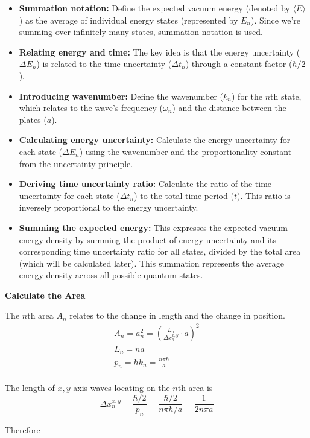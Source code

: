 \begin{itemize}
    \item \textbf{Summation notation:} Define the expected vacuum energy (denoted by $\langle E \rangle$ ) 
    as the average of individual energy states (represented by $E_n$). 
    Since we're summing over infinitely many states, summation notation is used.
    \item \textbf{Relating energy and time:} The key idea is that the energy uncertainty ($\Delta E_n$) is related 
    to the time uncertainty ($\Delta t_n$) through a constant factor ($\hbar/2$).
    \item \textbf{Introducing wavenumber:} Define the wavenumber ($k_n$) for the $n$th state, 
    which relates to the wave's frequency ($\omega_n$) and the distance between the plates ($a$).
    \item \textbf{Calculating energy uncertainty:} Calculate the energy uncertainty for each state ($\Delta E_n$)
     using the wavenumber and the proportionality constant from the uncertainty principle.
    \item \textbf{Deriving time uncertainty ratio:} Calculate the ratio of the time uncertainty for each state ($\Delta t_n$)
     to the total time period ($t$). This ratio is inversely proportional to the energy uncertainty.
    \item \textbf{Summing the expected energy:} This expresses the expected vacuum energy density by summing 
    the product of energy uncertainty and its corresponding time uncertainty ratio for all states, 
    divided by the total area (which will be calculated later). 
    This summation represents the average energy density across all possible quantum states.
\end{itemize}
\noindent\textbf{Calculate the Area}
\par
The \(n\)th area \(A_n\) relates to the change in length and the change in position.
    \begin{align*}
    &A_n = a_n^2 = (\frac{L_n}{\Delta x_n^{x,y}} \cdot a)^2&\\
    &L_n = n a&\\
    &p_n = \hbar k_n = \frac{n \pi \hbar}{a}&\\
    \end{align*}
    
    The length of $x, y$ axis waves locating on the $n$th area is
    \[\Delta x_n^{x, y} = \frac{\hbar/2}{p_n} = \frac{\hbar/2}{n \pi \hbar/a} = \frac{1}{2 n \pi a}\]
    
    Therefore

